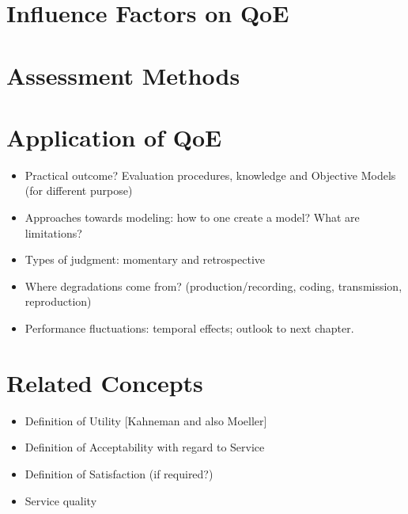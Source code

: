 \section{Influence Factors on \acl{QoE}} %

\section{Assessment Methods}






\section{Application of \acl{QoE}}
\begin{itemize}
\item Practical outcome? Evaluation procedures, knowledge and Objective Models (for different purpose)
\item Approaches towards modeling: how to one create a model? What are limitations?
\item Types of judgment: momentary and retrospective
\item Where degradations come from? (production/recording, coding, transmission, reproduction)
\item Performance fluctuations: temporal effects; outlook to next chapter.
\end{itemize}

\section{Related Concepts}
\begin{itemize}
\item Definition of Utility [Kahneman and also Moeller]
\item Definition of Acceptability with regard to Service
\item Definition of Satisfaction (if required?)
\item Service quality
\end{itemize}
